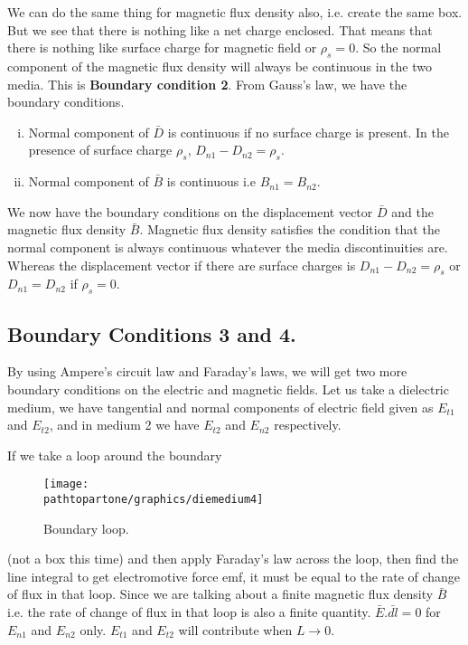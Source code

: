 We can do the same thing for magnetic flux density also, i.e. create the same box. But we see that there is nothing like a net charge enclosed. That means that there is nothing like surface charge for magnetic field or $\rho_s = 0$. So the normal component of the magnetic flux density will always be continuous in the two media. This is \textbf{Boundary condition 2}. From Gauss's law, we have the boundary conditions.
\begin{enumerate}[(i)]
\item Normal component of $\bar{D}$ is continuous if no surface charge is present. In the presence of surface charge $\rho_s$, $D_{n1}- D_{n2} = \rho_s$.
\item Normal component of $\bar{B}$ is continuous i.e $B_{n1} = B_{n2}$.
\end{enumerate}

We now have the boundary conditions on the displacement vector $\bar{D}$ and the magnetic flux density $\bar{B}$. Magnetic flux density satisfies the condition that the normal component is always continuous whatever the media discontinuities are. Whereas the displacement vector if there are surface charges  is $D_{n1}- D_{n2} = \rho_s$ or $D_{n1} = D_{n2} $ if $\rho_s = 0$. 
\subsection{Boundary Conditions 3 and 4.}
By using Ampere's circuit law and Faraday's laws, we will get two more boundary conditions on the electric and magnetic fields. Let us take a dielectric medium, we have tangential and normal components of electric field given as $E_{t1}$ and $E_{t2}$, and in medium 2 we have $E_{t2}$ and $E_{n2}$ respectively.

If we take a loop around the boundary
\begin{figure}[h]
\centering
\texttt{[image: \\pathtopartone/graphics/diemedium4]}
\caption{Boundary loop.}
\end{figure}
(not a box this time) and then apply Faraday's law across the loop, then find the line integral to get electromotive force emf, it must be equal to the rate of change of flux in that loop. Since we are talking about a finite magnetic flux density $\bar{B}$ i.e. the rate of change of flux in that loop is also a finite quantity. $\bar{E}.\bar{dl} = 0$ for $E_{n1}$ and $E_{n2}$ only. $E_{t1}$ and $E_{t2}$ will contribute when $L \longrightarrow 0$. 

